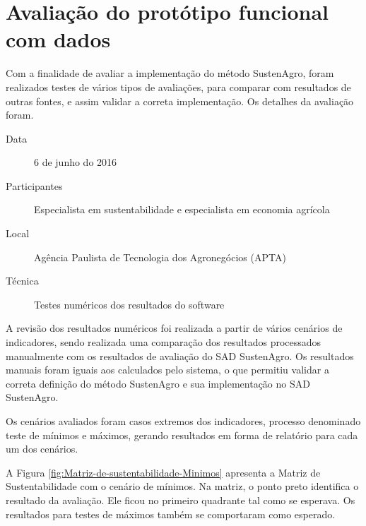 \section{Avaliação do protótipo funcional com dados}

Com a finalidade de avaliar a implementação do método SustenAgro,
foram realizados testes de vários tipos de avaliações, para comparar
com resultados de outras fontes, e assim validar a correta implementação.
Os detalhes da avaliação foram.
\begin{description}
\item [{Data}] 6 de junho do 2016
\item [{Participantes}] Especialista em sustentabilidade e especialista
em economia agrícola
\item [{Local}] Agência Paulista de Tecnologia dos Agronegócios (APTA)
\item [{Técnica}] Testes numéricos dos resultados do software
\end{description}
A revisão dos resultados numéricos foi realizada a partir de vários
cenários de indicadores, sendo realizada uma comparação dos resultados
processados manualmente com os resultados de avaliação do SAD SustenAgro.
Os resultados manuais foram iguais aos calculados pelo sistema, o
que permitiu validar a correta definição do método SustenAgro e sua
implementação no SAD SustenAgro. 

Os cenários avaliados foram casos extremos dos indicadores, processo
denominado teste de mínimos e máximos, gerando resultados em forma
de relatório para cada um dos cenários. 

A Figura \ref{fig:Matriz-de-sustentabilidade-Minimos} apresenta a
Matriz de Sustentabilidade com o cenário de mínimos. Na matriz, o
ponto preto identifica o resultado da avaliação. Ele ficou no primeiro
quadrante tal como se esperava. Os resultados para testes de máximos
também se comportaram como esperado.

